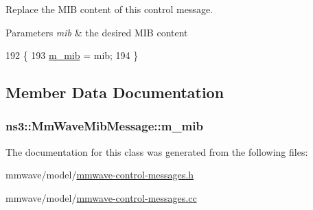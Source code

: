 Replace the M\+IB content of this control message. 


\begin{DoxyParams}{Parameters}
{\em mib} & the desired M\+IB content \\
\hline
\end{DoxyParams}

\begin{DoxyCode}
192 \{
193   \hyperlink{classns3_1_1MmWaveMibMessage_a9b80265e31732408a438d2e3590d039b}{m\_mib} = mib;
194 \}
\end{DoxyCode}


\subsection{Member Data Documentation}
\subsubsection[{\texorpdfstring{m\+\_\+mib}{m_mib}}]{ ns3\+::\+Mm\+Wave\+Mib\+Message\+::m\+\_\+mib\hspace{0.3cm}{\ttfamily [private]}}\hypertarget{classns3_1_1MmWaveMibMessage_a9b80265e31732408a438d2e3590d039b}{}\label{classns3_1_1MmWaveMibMessage_a9b80265e31732408a438d2e3590d039b}


The documentation for this class was generated from the following files\+:\begin{DoxyCompactItemize}
\item 
mmwave/model/\hyperlink{mmwave-control-messages_8h}{mmwave-\/control-\/messages.\+h}\item 
mmwave/model/\hyperlink{mmwave-control-messages_8cc}{mmwave-\/control-\/messages.\+cc}\end{DoxyCompactItemize}
